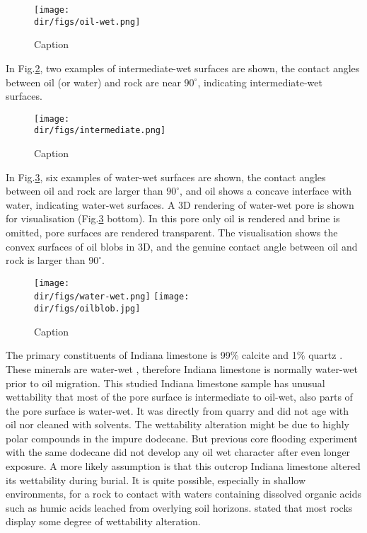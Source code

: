 \begin{figure}
    \centering
    \texttt{[image: \\dir/figs/oil-wet.png]}
    \caption{Caption}
    \label{oilwet}
\end{figure}

In Fig.\ref{intermediate}, two examples of intermediate-wet surfaces are shown, the contact angles between oil (or water) and rock are near $90^\circ$, indicating intermediate-wet surfaces.

\begin{figure}
    \centering
     \texttt{[image: \\dir/figs/intermediate.png]}
         \caption{Caption}
    \label{intermediate}
\end{figure}
     
In Fig.\ref{waterwet}, six examples of water-wet surfaces are shown, the contact angles between oil and rock are larger than $90^\circ$, and oil shows a concave interface with water, indicating water-wet surfaces. A 3D rendering of water-wet pore is shown for visualisation (Fig.\ref{waterwet} bottom). In this pore only oil is rendered and brine is omitted, pore surfaces are rendered transparent. The visualisation shows the convex surfaces of oil blobs in 3D, and the genuine contact angle between oil and rock is larger than $90^\circ$.

\begin{figure}
    \texttt{[image: \\dir/figs/water-wet.png]}
    \texttt{[image: \\dir/figs/oilblob.jpg]}
    \centering
    \caption{Caption}
    \label{waterwet}
\end{figure}

The primary constituents of Indiana limestone is 99\% calcite and 1\% quartz \citep{churcher1991rock}. These minerals are water-wet \citep{abdallah1986fundamentals}, therefore Indiana limestone is normally water-wet prior to oil migration. This studied Indiana limestone sample has unusual wettability that most of the pore surface is intermediate to oil-wet, also parts of the pore surface is water-wet. It was directly from quarry and did not age with oil nor cleaned with solvents. The wettability alteration might be due to highly polar compounds in the impure dodecane. But previous core flooding experiment with the same dodecane \citet{Pak2014thesis} did not develop any oil wet character after even longer exposure. A more likely assumption is that this outcrop Indiana limestone altered its wettability during burial. It is quite possible, especially in shallow environments, for a rock to contact with waters containing dissolved organic acids such as humic acids leached from overlying soil horizons. \citet{blunt2017multiphase} stated that most rocks display some degree of wettability alteration.

